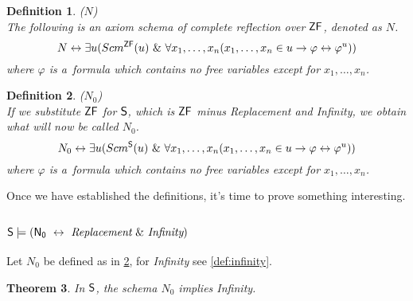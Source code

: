 \documentclass[12pt,a4paper]{article}
\newtheorem{theorem}{Theorem}[section]
\newtheorem{definition}[theorem]{Definition}
\renewcommand{\iff}{\leftrightarrow}
\newcommand{\then}{\rightarrow}
\begin{document}
\begin{definition}{($N$)}\label{def:levy_axiom_n}\\
The following is an axiom schema of complete reflection over $\sf{ZF}$, denoted as $N$.
\begin{equation}
N \iff \exists u (Scm^{\sf{ZF}}(u)\ \&\ \forall x_1, \ldots , x_n (x_1, \ldots , x_n \in u \then \varphi \iff \varphi^{u}))
\end{equation}
where $\varphi$ is a~formula which contains no free variables except for $x_1, \ldots , x_n$.
\end{definition}

\begin{definition}{($N_0$)}\label{def:levy_axiom_n0}\\
If we substitute $\sf{ZF}$ for $\sf{S}$, which is $\sf{ZF}$ minus \emph{Replacement} and \emph{Infinity}, we obtain what will now be called $N_0$.
\begin{equation}
N_0 \iff \exists u (Scm^{\sf{S}}(u)\ \&\ \forall x_1, \ldots , x_n (x_1, \ldots , x_n \in u \then \varphi \iff \varphi^{u}))
\end{equation}
where $\varphi$ is a~formula which contains no free variables except for $x_1, \ldots , x_n$.
\end{definition}

Once we have established the definitions, it's time to prove something interesting.
\subsection{$\sf{S} \models (N_0\ \iff\ \emph{Replacement}\ \&\ \emph{Infinity})$} 

Let $N_0$ be defined as in \ref{def:levy_axiom_n0}, for \emph{Infinity} see \ref{def:infinity}.
\begin{theorem}
In $\sf{S}$, the schema $N_0$ implies \emph{Infinity}.
\end{theorem}
\end{document}

